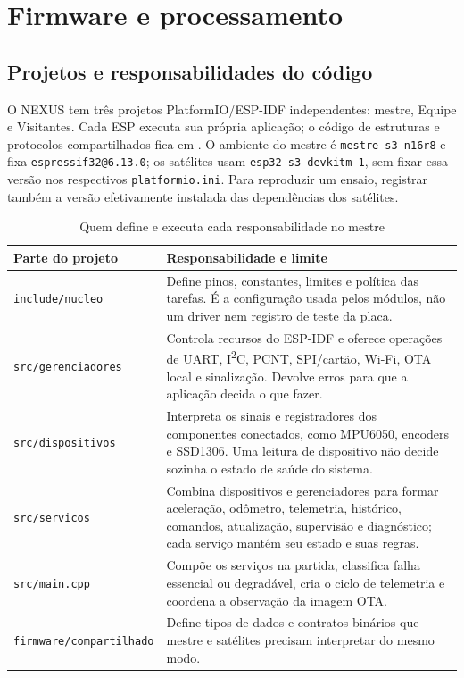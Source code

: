 \chapter{Firmware e processamento}\label{cap:firmware}
\section{Projetos e responsabilidades do código}
O NEXUS tem três projetos PlatformIO/ESP-IDF independentes: mestre, Equipe e Visitantes. Cada ESP executa sua própria aplicação; o código de estruturas e protocolos compartilhados fica em . O ambiente do mestre é \texttt{mestre-s3-n16r8} e fixa \texttt{espressif32@6.13.0}; os satélites usam \texttt{esp32-s3-devkitm-1}, sem fixar essa versão nos respectivos \texttt{platformio.ini}. Para reproduzir um ensaio, registrar também a versão efetivamente instalada das dependências dos satélites.

\begin{table}[htbp]\centering\small
\caption{Quem define e executa cada responsabilidade no mestre}\label{tab:camadas}
\begin{tabularx}{\textwidth}{@{}p{3.1cm}X@{}}\toprule
Parte do projeto & Responsabilidade e limite\\\midrule
\texttt{include/nucleo} & Define pinos, constantes, limites e política das tarefas. É a configuração usada pelos módulos, não um driver nem registro de teste da placa.\\
\texttt{src/gerenciadores} & Controla recursos do ESP-IDF e oferece operações de UART, I\textsuperscript{2}C, PCNT, SPI/cartão, Wi-Fi, OTA local e sinalização. Devolve erros para que a aplicação decida o que fazer.\\
\texttt{src/dispositivos} & Interpreta os sinais e registradores dos componentes conectados, como MPU6050, encoders e SSD1306. Uma leitura de dispositivo não decide sozinha o estado de saúde do sistema.\\
\texttt{src/servicos} & Combina dispositivos e gerenciadores para formar aceleração, odômetro, telemetria, histórico, comandos, atualização, supervisão e diagnóstico; cada serviço mantém seu estado e suas regras.\\
\texttt{src/main.cpp} & Compõe os serviços na partida, classifica falha essencial ou degradável, cria o ciclo de telemetria e coordena a observação da imagem OTA.\\
\texttt{firmware/compartilhado} & Define tipos de dados e contratos binários que mestre e satélites precisam interpretar do mesmo modo.\\\bottomrule
\end{tabularx}\end{table}

